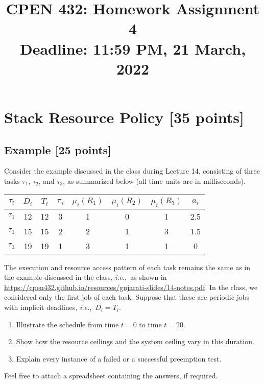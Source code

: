 \documentclass[12pt]{article}
\title{
  CPEN 432: Homework Assignment 4 \\
  \large
  Deadline: 11:59 PM, 21 March, 2022
}
\date{}
\newcommand{\ie}{{\textit{i.e.}}}
\begin{document}
\maketitle

\setlength{\baselineskip}{0.90\baselineskip}

\pagestyle{empty}

\section{Stack Resource Policy [35 points]}

\subsection{Example [25 points]}

Consider the example discussed in the class during Lecture 14,
consisting of three tasks $\tau_1$, $\tau_2$, and $\tau_3$, as summarized below
(all time units are in milliseconds).
\begin{table}[h]
\begin{center}
\begin{tabular}{cccccccc}
\toprule
$\tau_i$ & $D_i$ & $T_i$ & $\pi_i$ & $\mu_i(R_1)$ & $\mu_i(R_2)$ & $\mu_i(R_3)$ & $a_i$\\ \midrule
$\tau_1$ & 12 & 12 & 3 & 1 & 0 & 1 & 2.5 \\
$\tau_1$ & 15 & 15 & 2 & 2 & 1 & 3 & 1.5 \\
$\tau_1$ & 19 & 19 & 1 & 3 & 1 & 1 & 0   \\
\bottomrule
\end{tabular}
\end{center}
\end{table}
The execution and resource access pattern of each task remains the same as
in the example discussed in the class, \ie,~as shown in
\url{https://cpen432.github.io/resources/gujarati-slides/14-notes.pdf}.
In the class, we considered only the first job of each task.
Suppose that these are periodic jobs with implicit deadlines, \ie,~$D_i = T_i$.
\begin{enumerate}
\item Illustrate the schedule from time $t = 0$ to time $t = 20$.
\item Show how the resource ceilings and the system ceiling vary in this duration.
\item Explain every instance of a failed or a successful preemption test.
\end{enumerate}
Feel free to attach a spreadsheet containing the answers, if required.
\end{document}
